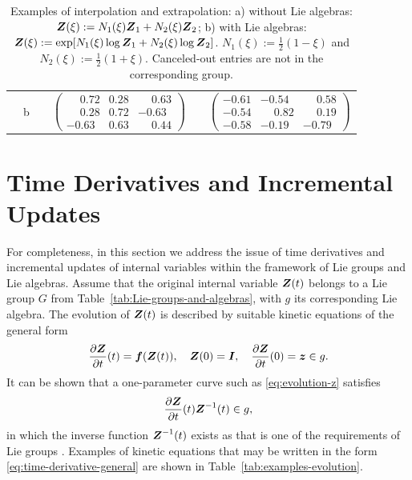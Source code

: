 \documentclass[12pt]{article}
\begin{document}
\begin{table}[htbp]
\begin{center}
\begin{tabular}{ c c c c c c}
      &
      \multirow{2}{*}{b}
      &

      &
      \multirow{2}{*}{
        $\left(
          \begin{smallmatrix}
            \phantom{-}0.72 & 0.28 & \phantom{-}0.63\\
            \phantom{-}0.28 & 0.72 & -0.63\\
            -0.63 & 0.63 & \phantom{-}0.44
          \end{smallmatrix}
        \right)$}
      &

      &
      \multirow{2}{*}{
        $\left(
          \begin{smallmatrix}
            -0.61 & -0.54 & \phantom{-}0.58\\
            -0.54 & \phantom{-}0.82 & \phantom{-}0.19\\
            -0.58 & -0.19 & -0.79
          \end{smallmatrix}
        \right)$}
      \\
      \\
      \bottomrule
    \end{tabular}
    \caption{Examples of interpolation and extrapolation: a) without
      Lie algebras: ${\boldsymbol{Z}}(\xi) := N_1(\xi){\boldsymbol{Z}}_1 + N_2(\xi){\boldsymbol{Z}}_2$; b)
      with Lie algebras: ${\boldsymbol{Z}}(\xi) := \exp[N_1(\xi)\log{\boldsymbol{Z}}_1 +
      N_2(\xi)\log{\boldsymbol{Z}}_2]$. $N_1(\xi):=\frac{1}{2}(1-\xi)$ and
      $N_2(\xi):=\frac{1}{2}(1+\xi)$. Canceled-out entries are not in
      the corresponding group.}
    \label{tab:examples-interpolation}
  \end{center}
\end{table}

\section{Time Derivatives and Incremental Updates}
\label{sec:derivatives}

For completeness, in this section we address the issue of time
derivatives and incremental updates of internal variables within the
framework of Lie groups and Lie algebras. Assume that the original
internal variable ${\boldsymbol{Z}}(t)$ belongs to a Lie group $G$ from
Table~\ref{tab:Lie-groups-and-algebras}, with $g$ its corresponding Lie
algebra. The evolution of ${\boldsymbol{Z}}(t)$ is described by suitable kinetic
equations of the general form
\begin{equation} \label{eq:evolution-z}
  \frac{\partial {\boldsymbol{Z}}}{\partial t}(t) = {\boldsymbol{f}}({\boldsymbol{Z}}(t)), \quad
  {\boldsymbol{Z}}(0) = {\boldsymbol{I}}, \quad
  \frac{\partial {\boldsymbol{Z}}}{\partial t}(0) = {\boldsymbol{z}} \in g.
\end{equation}
It can be shown that a one-parameter curve such as
\eqref{eq:evolution-z} satisfies
\begin{equation} \label{eq:time-derivative-general}
  \frac{\partial {\boldsymbol{Z}}}{\partial t}(t) {\boldsymbol{Z}}^{-1}(t) \in g,
\end{equation}
in which the inverse function ${\boldsymbol{Z}}^{-1}(t)$ exists as that is one of
the requirements of Lie groups \citep{Procesi:2006, Sepanski:2007,
  Kosmann-Schwarzbach:2009, Gallier:2011}. Examples of kinetic
equations that may be written in the form
\eqref{eq:time-derivative-general} are shown in
Table~\ref{tab:examples-evolution}.
\end{document}

